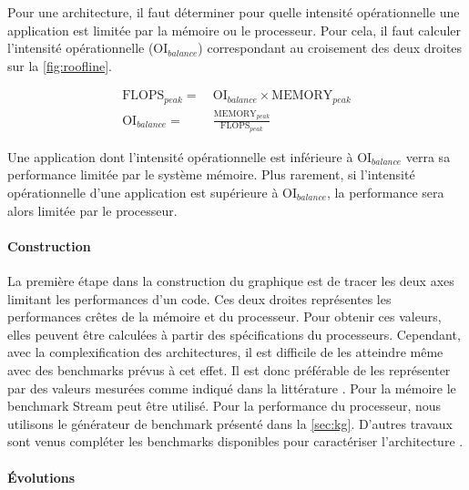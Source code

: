 Pour une architecture, il faut déterminer pour quelle intensité opérationnelle une application est limitée par la mémoire ou le processeur. Pour cela, il faut calculer l’intensité opérationnelle ($\text{OI}_{balance}$) correspondant au croisement des deux droites sur la \autoref{fig:roofline}. 

\begin{equation}
\begin{aligned}
 \text{FLOPS}_{peak} =\ &\text{OI}_{balance} \times \text{MEMORY}_{peak} \\[20pt]
 \text{OI}_{balance} =\ &\frac{\text{MEMORY}_{peak}} {\text{FLOPS}_{peak}} 
\end{aligned}
\end{equation}

Une application dont l’intensité opérationnelle est inférieure à $\text{OI}_{balance}$ verra sa performance limitée par le système mémoire. Plus rarement, si l’intensité opérationnelle d’une application est supérieure à $\text{OI}_{balance}$, la performance sera alors limitée par le processeur.

\paragraph{Construction}
La première étape dans la construction du graphique est de tracer les deux axes limitant les performances d’un code. Ces deux droites représentes les performances crêtes de la mémoire et du processeur. Pour obtenir ces valeurs, elles peuvent être calculées à partir des spécifications du processeurs. Cependant, avec la complexification des architectures, il est difficile de les atteindre même avec des benchmarks prévus à cet effet. Il est donc préférable de les représenter par des valeurs mesurées comme indiqué dans la littérature  \cite{farjallah2014preparing}. Pour la mémoire le benchmark Stream peut être utilisé. Pour la performance du processeur, nous utilisons le générateur de benchmark présenté dans la \autoref{sec:kg}. D’autres travaux sont venus compléter les benchmarks disponibles pour caractériser l’architecture \cite{lo2014roofline}.




\paragraph{Évolutions}


